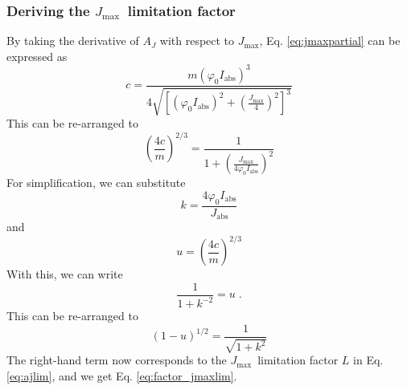 \documentclass{myreport}
\newcommand{\jmax}{$J_{\text{max}}$}
\begin{document}
\subsubsection{Deriving the \jmax\ limitation factor}
\label{sec:steps_jmaxlim}

By taking the derivative of $A_J$ with respect to \jmax , Eq. \ref{eq:jmaxpartial} can be expressed as
\begin{equation}
    c = \frac{ m (\varphi_0 I_\text{abs})^3}{ 4 \sqrt{ \left[ (\varphi_0 I_\text{abs})^2 + (\frac{J_\text{max}}{4})^2 \right]^3 }}
\end{equation}
This can be re-arranged to
\begin{equation}
    \left(\frac{4c}{m}\right)^{2/3} = \frac{1}{1 + \left( \frac{J_\text{max}}{4\varphi_0 I_\text{abs}}\right)^2}
\end{equation}
For simplification, we can substitute 
\begin{equation}
    k = \frac{4 \varphi_0 I_\text{abs}}{J_\text{abs}}
\end{equation}
and 
\begin{equation}
    u = \left(\frac{4c}{m}\right)^{2/3}
\end{equation}
With this, we can write
\begin{equation}
    \frac{1}{1+k^{-2}} = u \;.
\end{equation}
This can be re-arranged to 
\begin{equation}
    (1-u)^{1/2} = \frac{1}{\sqrt{1+k^2}} 
\end{equation}
The right-hand term now corresponds to the \jmax\ limitation factor $L$ in Eq. \ref{eq:ajlim}, and we get Eq. \ref{eq:factor_jmaxlim}.
\end{document}
